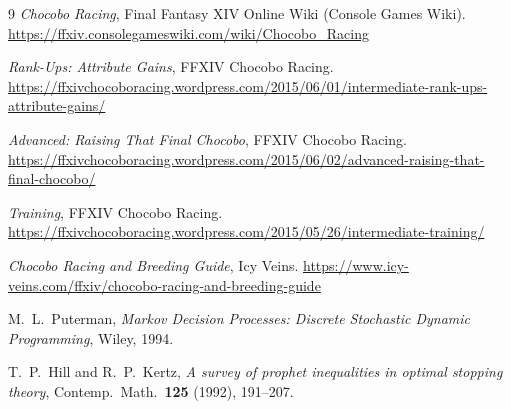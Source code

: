 \documentclass[11pt]{article}
\theoremstyle{remark}
\begin{document}
\begin{thebibliography}{9}
 \emph{Chocobo Racing}, Final Fantasy XIV Online Wiki (Console Games
Wiki). \url{https://ffxiv.consolegameswiki.com/wiki/Chocobo_Racing}

 \emph{Rank-Ups: Attribute Gains}, FFXIV Chocobo Racing.
\url{https://ffxivchocoboracing.wordpress.com/2015/06/01/intermediate-rank-ups-attribute-gains/}

 \emph{Advanced: Raising That Final Chocobo}, FFXIV Chocobo Racing.
\url{https://ffxivchocoboracing.wordpress.com/2015/06/02/advanced-raising-that-final-chocobo/}

 \emph{Training}, FFXIV Chocobo Racing.
\url{https://ffxivchocoboracing.wordpress.com/2015/05/26/intermediate-training/}

 \emph{Chocobo Racing and Breeding Guide}, Icy Veins.
\url{https://www.icy-veins.com/ffxiv/chocobo-racing-and-breeding-guide}

 M.~L.~Puterman, \emph{Markov Decision Processes: Discrete Stochastic
Dynamic Programming}, Wiley, 1994.

 T.~P.~Hill and R.~P.~Kertz, \emph{A survey of prophet inequalities
in optimal stopping theory}, Contemp.\ Math.\ \textbf{125} (1992), 191--207.
\end{thebibliography}
\end{document}
